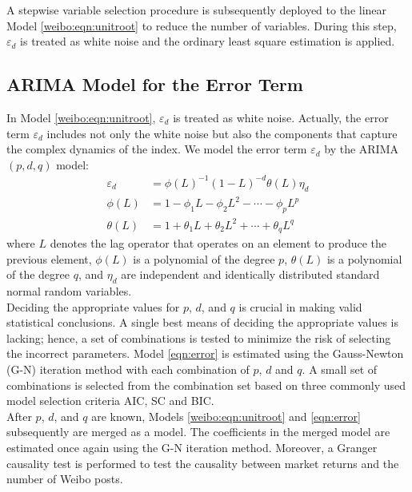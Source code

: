 \documentclass[review,3p,times,12pt,number]{elsarticle}
\begin{document}
A stepwise variable selection procedure is subsequently deployed to the linear Model \ref{weibo:eqn:unitroot} to reduce the number of variables. During this step, $\varepsilon_d$ is treated as white noise and the ordinary least square estimation is applied.

\subsection{ARIMA Model for the Error Term}
In Model \ref{weibo:eqn:unitroot}, $\varepsilon_d$ is treated as white noise. Actually, the error term $\varepsilon_d$ includes not only the white noise but also the components that capture the complex dynamics of the index. We model the error term $\varepsilon_d$ by the ARIMA$(p, d, q)$ model:
\begin{eqnarray}
\label{eqn:error}
	\nonumber \varepsilon_d &= \phi(L)^{-1}(1-L)^{-d}\theta(L)\eta_d  \\
	\phi(L)       &= 1-\phi_1 L - \phi_2 L^2 - \cdots - \phi_p L^p \\
	\nonumber \theta(L)     &= 1+\theta_1 L + \theta_2 L^2 + \cdots + \theta_q L^q
\end{eqnarray}
where $L$ denotes the lag operator that operates on an element to produce the previous element, $\phi(L)$ is a polynomial of the degree $p$, $\theta(L)$ is a polynomial of the degree $q$, and $\eta_d$ are independent and identically distributed standard normal random variables.\\
\indent
Deciding the appropriate values for $p$, $d$, and $q$ is crucial in making valid statistical conclusions. A single best means of deciding the appropriate values is lacking; hence, a set of combinations is tested to minimize the risk of selecting the incorrect parameters. Model \ref{eqn:error} is estimated using the Gauss-Newton (G-N) iteration method with each combination of $p$, $d$ and $q$.
A small set of combinations is selected from the combination set based on three commonly used model selection criteria AIC, SC and BIC.\\
\indent
After $p$, $d$, and $q$ are known, Models \ref{weibo:eqn:unitroot} and \ref{eqn:error} subsequently are merged as a model. The coefficients in the merged model are estimated once again using the G-N iteration method.
Moreover, a Granger causality test is performed to test the causality between market returns and the number of Weibo posts.
\end{document}

